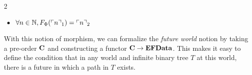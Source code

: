 \documentclass[a4paper,UKenglish,cleveref, autoref, thm-restate]{lipics-v2021}
\begin{document}
\begin{definition}
\begin{multicols}{2}
\begin{itemize}
  \item $\forall n \in \mathbb N, F_{\Phi}({\ulcorner n\urcorner}_1) = {\ulcorner n\urcorner}_2$
  \end{itemize}
\end{multicols}
\end{definition}

With this notion of morphism, we can formalize the \emph{future world} notion by taking
a pre-order $\mathbf{C}$ and constructing a functor $\mathbf{C} \to \mathbf{EFData}$.
This makes it easy to define the condition that in any world and infinite binary tree $T$
at this world, there is a future in which a path in $T$ exists.
\end{document}
